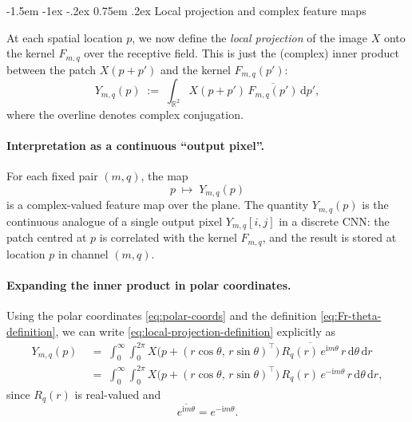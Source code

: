 \documentclass[12pt]{article}
\makeatletter
\renewcommand\subsection{\@startsection{subsection}{2}{\z@}%
                                     {-1.5em \@plus -1ex \@minus -.2ex}%
                                     {0.75em \@plus .2ex}%
                                     {\normalfont\large\bfseries}}
\makeatother
\begin{document}
\subsection{Local projection and complex feature maps}

At each spatial location $p$, we now define the \emph{local projection}
of the image $X$ onto the kernel $F_{m,q}$ over the receptive field.
This is just the (complex) inner product between the patch
$X(p + p')$ and the kernel $F_{m,q}(p')$:
\begin{equation}
  \label{eq:local-projection-definition}
  Y_{m,q}(p)
  \;:=\;
  \int_{\mathbb{R}^2}
    X(p + p')\,
    \overline{F_{m,q}(p')}\,
  \mathrm{d}p',
\end{equation}
where the overline denotes complex conjugation.

\paragraph{Interpretation as a continuous ``output pixel''.}
For each fixed pair $(m,q)$, the map
\[
  p \;\longmapsto\; Y_{m,q}(p)
\]
is a complex-valued feature map over the plane. The quantity
$Y_{m,q}(p)$ is the continuous analogue of a single output pixel
$Y_{m,q}[i,j]$ in a discrete CNN: the patch centred at $p$ is
correlated with the kernel $F_{m,q}$, and the result is stored at
location $p$ in channel $(m,q)$.

\paragraph{Expanding the inner product in polar coordinates.}

Using the polar coordinates \eqref{eq:polar-coords} and the definition
\eqref{eq:Fr-theta-definition}, we can write
\eqref{eq:local-projection-definition} explicitly as
\begin{align}
  Y_{m,q}(p)
  \;&=\;
  \int_0^\infty\!\int_0^{2\pi}
    X\bigl(p + (r\cos\theta,\,r\sin\theta)^\top\bigr)\,
    \overline{R_q(r)\,e^{\mathrm{i}m\theta}}\,
    r\,\mathrm{d}\theta\,\mathrm{d}r
  \label{eq:local-projection-polar-1}
  \\
  \;&=\;
  \int_0^\infty\!\int_0^{2\pi}
    X\bigl(p + (r\cos\theta,\,r\sin\theta)^\top\bigr)\,
    R_q(r)\,e^{-\mathrm{i}m\theta}\,
    r\,\mathrm{d}\theta\,\mathrm{d}r,
  \label{eq:local-projection-polar-2}
\end{align}
since $R_q(r)$ is real-valued and
\[
  \overline{e^{\mathrm{i}m\theta}} = e^{-\mathrm{i}m\theta}.
\]
\end{document}
